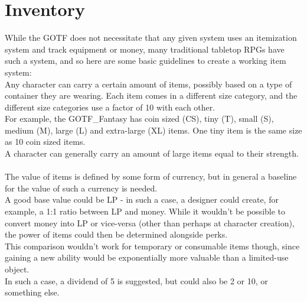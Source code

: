 \section{Inventory}\label{sec:inventory}
While the GOTF does not necessitate that any given system uses an itemization system and track equipment or money, many traditional tabletop RPGs have such a system, and so here are some basic guidelines to create a working item system:\\
Any character can carry a certain amount of items, possibly based on a type of container they are wearing.
Each item comes in a different size category, and the different size categories use a factor of 10 with each other.\\
For example, the GOTF\_Fantasy has coin sized (CS), tiny (T), small (S), medium (M), large (L) and extra-large (XL) items.
One tiny item is the same size as 10 coin sized items.\\
A character can generally carry an amount of large items equal to their strength.\\
\\
The value of items is defined by some form of currency, but in general a baseline for the value of such a currency is needed.\\
A good base value could be LP - in such a case, a designer could create, for example, a 1:1 ratio between LP and money.
While it wouldn't be possible to convert money into LP or vice-versa (other than perhaps at character creation), the power of items could then be determined alongside perks.\\
This comparison wouldn't work for temporary or consumable items though, since gaining a new ability would be exponentially more valuable than a limited-use object.\\
In such a case, a dividend of 5 is suggested, but could also be 2 or 10, or something else.\\